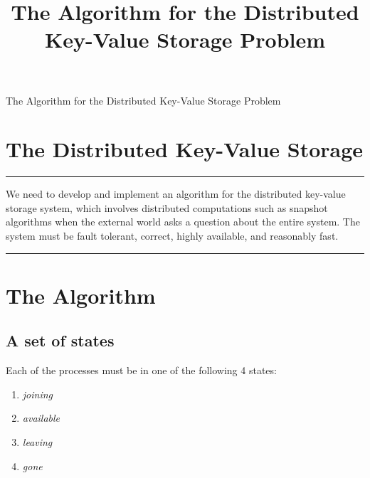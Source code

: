 \documentclass[11pt]{article}
\newenvironment{problem}[1]{
\medskip \hrule \medskip
\noindent {\bf Problem #1.}
}{
\medskip \hrule \medskip
}
\begin{document}
\title{The Algorithm for the Distributed Key-Value Storage Problem}
\author{
\and
{}
}

\pagestyle{fancy}


\vspace*{0.1in}
\begin{center} \Large The Algorithm for the Distributed Key-Value Storage Problem \end{center}

\section{The Distributed Key-Value Storage}
\begin{problem}{Statement}
We need to develop and implement an algorithm for the distributed key-value storage system, which involves distributed computations such as snapshot algorithms when the external world asks a question about the entire system. The system must be fault tolerant, correct, highly available, and reasonably fast.
\end{problem}


\section{The Algorithm}
\subsection{A set of states}
Each of the processes must be in one of the following 4 states:
\newcommand{\numStates}{4}
\newcommand{\joining}{\textit{joining} }
\newcommand{\available}{\textit{available} }
\newcommand{\leaving}{\textit{leaving} }
\newcommand{\gone}{\textit{gone} }
\newcommand{\red}{\textit{gathering\_facts} }
\newcommand{\white}{\textit{backing\_up} }
\begin{enumerate}
\item \joining
\item \available
\item \leaving
\item \gone
\end{enumerate}
\end{document}
